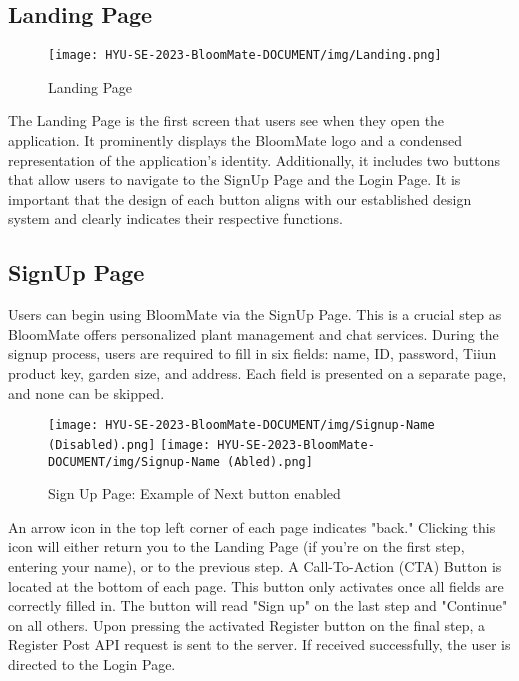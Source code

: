 \documentclass[conference, a4paper]{IEEEtran}
\begin{document}

\subsection{Landing Page}

\begin{figure}[h]
\centering
\texttt{[image: HYU-SE-2023-BloomMate-DOCUMENT/img/Landing.png]}
\label{fig:Landing}
\caption{Landing Page} 
\end{figure}

The Landing Page is the first screen that users see when they open the application. It prominently displays the BloomMate logo and a condensed representation of the application's identity. Additionally, it includes two buttons that allow users to navigate to the SignUp Page and the Login Page. It is important that the design of each button aligns with our established design system and clearly indicates their respective functions.

\subsection{SignUp Page}

Users can begin using BloomMate via the SignUp Page. This is a crucial step as BloomMate offers personalized plant management and chat services. During the signup process, users are required to fill in six fields: name, ID, password, Tiiun product key, garden size, and address. Each field is presented on a separate page, and none can be skipped.

   \begin{figure}[h]
    \centerline{
        \texttt{[image: HYU-SE-2023-BloomMate-DOCUMENT/img/Signup-Name (Disabled).png]}
        \texttt{[image: HYU-SE-2023-BloomMate-DOCUMENT/img/Signup-Name (Abled).png]}
    }
    \label{fig}
    \caption{Sign Up Page: Example of Next button enabled}
    \end{figure}
    
An arrow icon in the top left corner of each page indicates "back." Clicking this icon will either return you to the Landing Page (if you're on the first step, entering your name), or to the previous step. A Call-To-Action (CTA) Button is located at the bottom of each page. This button only activates once all fields are correctly filled in. The button will read "Sign up" on the last step and "Continue" on all others. Upon pressing the activated Register button on the final step, a Register Post API request is sent to the server. If received successfully, the user is directed to the Login Page.
    
\end{document}
